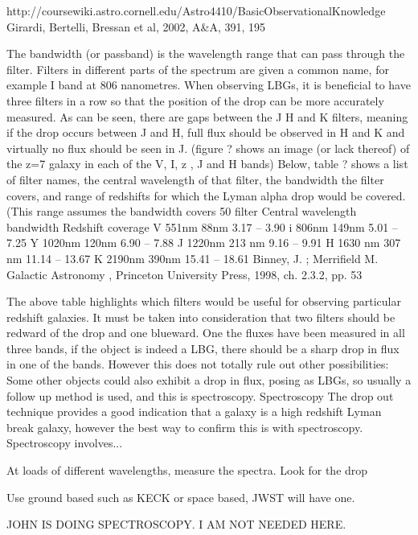 http://coursewiki.astro.cornell.edu/Astro4410/BasicObservationalKnowledge
Girardi, Bertelli, Bressan et al, 2002, A&A, 391, 195

The bandwidth (or passband) is the wavelength range that can pass through the filter. Filters in different parts of the spectrum are given a common name, for example I band at 806 nanometres. When observing LBGs, it is beneficial to have three filters in a row so that the position of the drop can be more accurately measured. As can be seen, there are gaps between the J H and K filters, meaning if the drop occurs between J and H, full flux should be observed in H and K and virtually no flux should be seen in J. (figure ? shows an image (or lack thereof) of the z=7 galaxy in each of the V, I, z , J and H bands) Below, table ? shows a list of filter names, the central wavelength of that filter, the bandwidth the filter covers, and range of redshifts for which the Lyman alpha drop would be covered. (This  range assumes the bandwidth covers 50%
filter	Central wavelength 	bandwidth	Redshift coverage
V	551nm			88nm 		3.17 – 3.90	
i 	806nm			149nm		5.01 – 7.25
Y	1020nm		120nm		6.90 – 7.88
J	1220nm		213 nm		9.16 – 9.91
H 	1630 nm		307 nm	 	11.14 – 13.67
K 	2190nm		390nm		15.41 – 18.61
Binney, J. ; Merrifield M. Galactic Astronomy , Princeton University Press, 1998, ch. 2.3.2, pp. 53 

The above table highlights which filters would be useful for observing particular redshift galaxies. It must be taken into consideration that two filters should be redward of the drop and one blueward. One the fluxes have been measured in all three bands, if the object is indeed a LBG, there should be a sharp drop in flux in  one of the bands. However this does not totally rule out other possibilities: Some other objects could also exhibit a drop in flux, posing as LBGs, so usually a follow up method is used, and this is spectroscopy. Spectroscopy The drop out technique provides a good indication that a galaxy is a high redshift Lyman break galaxy, however the best way to confirm this is with spectroscopy. Spectroscopy involves...

At loads of different wavelengths, measure the spectra. Look for the drop
 
Use ground based such as KECK or space based, JWST will have one.

JOHN IS DOING SPECTROSCOPY. I AM NOT NEEDED HERE.